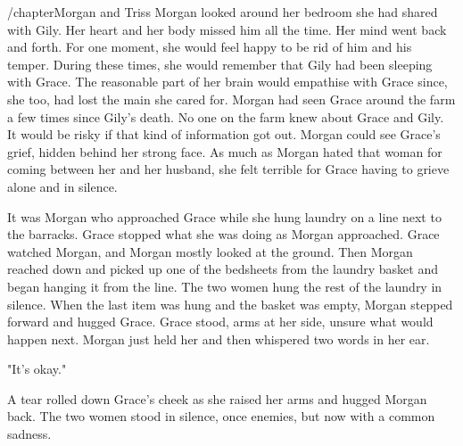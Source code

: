 \documentclass[courier]{sffms}
\begin{document}
/chapter{Morgan and Triss}
Morgan looked around her bedroom she had shared with
Gily. Her heart and her body missed him all the time.
Her mind went back and forth. For one moment, she
would feel happy to be rid of him and his temper. During
these times, she would remember that Gily had been
sleeping with Grace. The reasonable part of her brain would
empathise with Grace since, she too, had lost the main she
cared for. Morgan had seen Grace around the farm a few
times since Gily's death. No one on the farm knew about
Grace and Gily. It would be risky if that kind of information
got out. Morgan could see Grace's grief, hidden behind her
strong face. As much as Morgan hated that woman for
coming between her and her husband, she felt terrible
for Grace having to grieve alone and in silence.

It was Morgan who approached Grace while she hung
laundry on a line next to the barracks. Grace stopped
what she was doing as Morgan approached. Grace watched
Morgan, and Morgan mostly looked at the ground.
Then Morgan reached down and picked up one of the bedsheets
from the laundry basket and began hanging it from the line.
The two women hung the rest of the laundry in silence. When
the last item was hung and the basket was empty, Morgan
stepped forward and hugged Grace. Grace stood, arms at her
side, unsure what would happen next. Morgan just held her
and then whispered two words in her ear.

"It's okay."

A tear rolled down Grace's cheek as she raised her arms and
hugged Morgan back. The two women stood in silence,
once enemies, but now with a common sadness.
\end{document}
